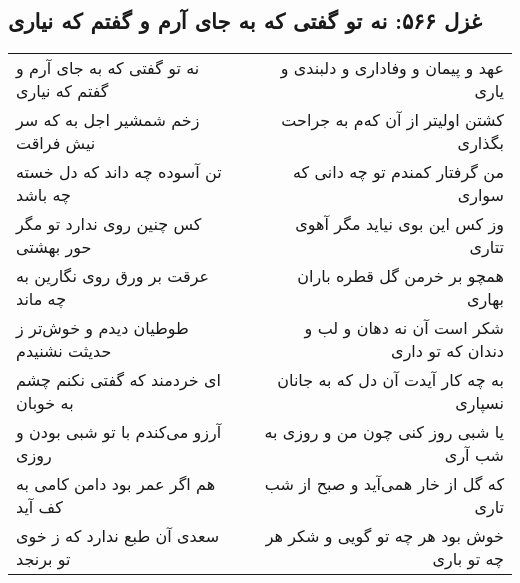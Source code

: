 \begin{center}
\section*{غزل ۵۶۶: نه تو گفتی که به جای آرم و گفتم که نیاری}
\label{sec:566}
\begin{longtable}{l p{0.5cm} r}
نه تو گفتی که به جای آرم و گفتم که نیاری
&&
عهد و پیمان و وفاداری و دلبندی و یاری
\\
زخم شمشیر اجل به که سر نیش فراقت
&&
کشتن اولیتر از آن که‌م به جراحت بگذاری
\\
تن آسوده چه داند که دل خسته چه باشد
&&
من گرفتار کمندم تو چه دانی که سواری
\\
کس چنین روی ندارد تو مگر حور بهشتی
&&
وز کس این بوی نیاید مگر آهوی تتاری
\\
عرقت بر ورق روی نگارین به چه ماند
&&
همچو بر خرمن گل قطره باران بهاری
\\
طوطیان دیدم و خوش‌تر ز حدیثت نشنیدم
&&
شکر است آن نه دهان و لب و دندان که تو داری
\\
ای خردمند که گفتی نکنم چشم به خوبان
&&
به چه کار آیدت آن دل که به جانان نسپاری
\\
آرزو می‌کندم با تو شبی بودن و روزی
&&
یا شبی روز کنی چون من و روزی به شب آری
\\
هم اگر عمر بود دامن کامی به کف آید
&&
که گل از خار همی‌آید و صبح از شب تاری
\\
سعدی آن طبع ندارد که ز خوی تو برنجد
&&
خوش بود هر چه تو گویی و شکر هر چه تو باری
\\
\end{longtable}
\end{center}
